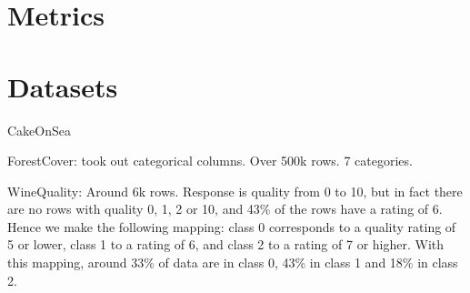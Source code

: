 \documentclass[../main.tex]{subfiles}
\begin{document}
\section{Metrics}

\section{Datasets}

CakeOnSea

ForestCover: took out categorical columns.
Over 500k rows. 7 categories.

WineQuality: Around 6k rows. Response is quality from 0 to 10, but in fact there are no rows with quality 0, 1, 2 or 10, and 43\% of the rows have a rating of 6.
Hence we make the following mapping: class 0 corresponds to a quality rating of 5 or lower, class 1 to a rating of 6, and class 2 to a rating of 7 or higher.
With this mapping, around 33\% of data are in class 0, 43\% in class 1 and 18\% in class 2.
\end{document}
